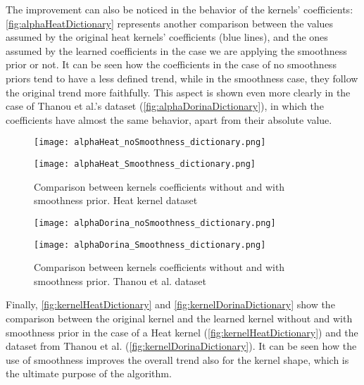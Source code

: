 The improvement can also be noticed in the behavior of the kernels' coefficients: \autoref{fig:alphaHeatDictionary} represents another comparison between the values assumed by the original heat kernels' coefficients (blue lines), and the ones assumed by the learned coefficients in the case we are applying the smoothness prior or not. It can be seen how the coefficients in the case of no smoothness priors tend to have a less defined trend, while in the smoothness case, they follow the original trend more faithfully. This aspect is shown even more clearly in the case of Thanou et al.'s dataset (\autoref{fig:alphaDorinaDictionary}), in which the coefficients have almost the same behavior, apart from their absolute value.

\begin{figure}
  \centering
  \begin{minipage}[c]{.8\textwidth}
    \centering
    \texttt{[image: alphaHeat\_noSmoothness\_dictionary.png]}
  \end{minipage}
  \begin{minipage}[c]{.8\textwidth}
    \centering
    \texttt{[image: alphaHeat\_Smoothness\_dictionary.png]}
  \end{minipage}
  \caption{Comparison between kernels coefficients without and with smoothness prior. Heat kernel   dataset}
  \label{fig:alphaHeatDictionary}
\end{figure}

\begin{figure}
  \centering
  \begin{minipage}[c]{.8\textwidth}
    \centering
    \texttt{[image: alphaDorina\_noSmoothness\_dictionary.png]}
  \end{minipage}
  \begin{minipage}[c]{.8\textwidth}
    \centering
    \texttt{[image: alphaDorina\_Smoothness\_dictionary.png]}
  \end{minipage}
  \caption{Comparison between kernels coefficients without and with smoothness prior. Thanou et al.   dataset}
  \label{fig:alphaDorinaDictionary}
\end{figure}


Finally, \autoref{fig:kernelHeatDictionary} and \autoref{fig:kernelDorinaDictionary} show the comparison between the original kernel and the learned kernel without and with smoothness prior in the case of a Heat kernel (\ref{fig:kernelHeatDictionary}) and the dataset from  Thanou et al. (\ref{fig:kernelDorinaDictionary}). It can be seen how the use of smoothness improves the overall trend also for the kernel shape, which is the ultimate purpose of the algorithm.

